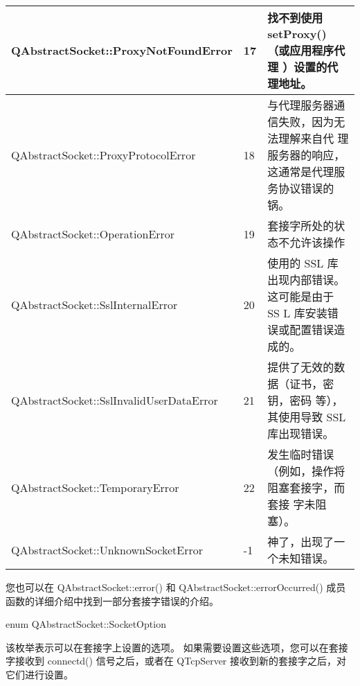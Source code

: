 \begin{longtable}{|m{20em}|m{2em}|m{19em}|}
\hline
QAbstractSocket::ProxyNotFoundError&	17&	找不到使用 setProxy() （或应用程序代理
）设置的代理地址。\\
\hline
QAbstractSocket::ProxyProtocolError&	18&	与代理服务器通信失败，因为无法理解来自代
理服务器的响应，这通常是代理服务协议错误的锅。\\
\hline
QAbstractSocket::OperationError&	19&	套接字所处的状态不允许该操作\\
\hline
QAbstractSocket::SslInternalError&	20&	使用的 SSL 库出现内部错误。 这可能是由于 SS
L 库安装错误或配置错误造成的。\\
\hline
QAbstractSocket::SslInvalidUserDataError&	21&	提供了无效的数据（证书，密钥，密码
等），其使用导致 SSL 库出现错误。\\
\hline
QAbstractSocket::TemporaryError&	22&	发生临时错误（例如，操作将阻塞套接字，而套接
字未阻塞）。\\
\hline
QAbstractSocket::UnknownSocketError&	-1&	神了，出现了一个未知错误。\\
\hline
\end{longtable}

您也可以在 QAbstractSocket::error() 和 QAbstractSocket::errorOccurred() 成员函数的详细介绍中找到一部分套接字错误的介绍。

\splitLine

enum QAbstractSocket::SocketOption

该枚举表示可以在套接字上设置的选项。 如果需要设置这些选项，您可以在套接字接收到 connectd() 信号之后，或者在 QTcpServer 接收到新的套接字之后，对它们进行设置。

